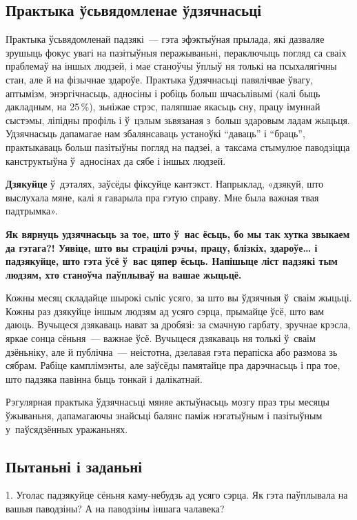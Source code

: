 \subsection*{Практыка ўсьвядомленае ўдзячнасьці}

Практыка ўсьвядомленай падзякі~--- гэта эфэктыўная прылада, які дазваляе зрушыць фокус увагі на пазітыўныя перажываньні, пераключыць погляд са сваіх праблемаў на іншых людзей, і мае станоўчы ўплыў ня толькі на псыхалягічны стан, але й на фізычнае здароўе. Практыка ўдзячнасьці павялічвае ўвагу, аптымізм, энэргічнасьць, адносіны і робіць больш шчасьлівымі (калі быць дакладным, на 25\,\%), зьніжае стрэс, паляпшае якасьць сну, працу імуннай сыстэмы, ліпідны профіль і ў~цэлым зьвязаная з~больш здаровым ладам жыцьця. Удзячнасьць дапамагае нам збалянсаваць устаноўкі ``даваць'' і ``браць'', практыкаваць больш пазітыўны погляд на падзеі, а~таксама стымулюе паводзіцца канструктыўна ў~адносінах да сябе і іншых людзей.

\textbf{Дзякуйце} ў~дэталях, заўсёды фіксуйце кантэкст. Напрыклад, «дзякуй, што выслухала мяне, калі я гаварыла пра гэтую справу. Мне была важная твая падтрымка».

\textbf{Як вярнуць удзячнасьць за тое, што ў~нас ёсьць, бо мы так хутка звыкаем да гэтага?! Уявіце, што вы страцілі рэчы, працу, блізкіх, здароўе… і падзякуйце, што гэта ўсё ў~вас цяпер ёсьць. Напішыце ліст падзякі тым людзям, хто станоўча паўплываў на вашае жыцьцё.}

Кожны месяц складайце шырокі сьпіс усяго, за што вы ўдзячныя ў~сваім жыцьці. Кожны раз дзякуйце іншым людзям ад усяго сэрца, прымайце ўсё, што вам даюць. Вучыцеся дзякаваць нават за дробязі: за смачную гарбату, зручнае крэсла, яркае сонца сёньня~--- важнае ўсё. Вучыцеся дзякаваць ня толькі ў~сваім дзёньніку, але й публічна~--- неістотна, дзелавая гэта перапіска або размова зь сябрам. Рабіце камплімэнты, але заўсёды памятайце пра дарэчнасьць і пра тое, што падзяка павінна быць тонкай і далікатнай.

Рэгулярная практыка ўдзячнасьці мяняе актыўнасьць мозгу праз тры месяцы ўжываньня, дапамагаючы знайсьці балянс паміж нэгатыўным і пазітыўным у~паўсядзённых уражаньнях.

\subsection*{Пытаньні і заданьні}

1. Уголас падзякуйце сёньня каму-небудзь ад усяго сэрца. Як гэта паўплывала на вашыя паводзіны? А на паводзіны іншага чалавека?

